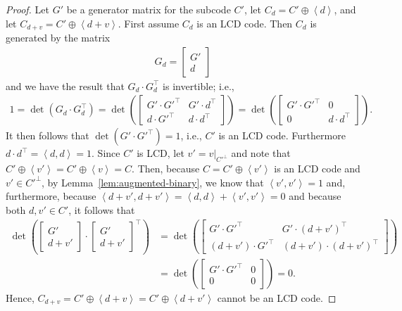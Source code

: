 \documentclass[11pt]{article}
\theoremstyle{definition}
\newcommand{\Ang}[1]{\left\langle#1\right\rangle}
\begin{document}
\begin{proof}
	Let $G'$ be a generator matrix for the subcode $C'$, let $C_d = C' \oplus \Ang{d}$, and let $C_{d + v} = C' \oplus \Ang{d + v}$.
	First  assume $C_d$ is an LCD code.
	Then $C_d$ is generated by the matrix
	\begin{align*}
		G_d = \begin{bmatrix}
			G' \\
			d
		\end{bmatrix}
	\end{align*}
	and we have the result that $G_d \cdot G_d^\top$ is invertible; i.e.,
	\begin{align*}
		1
		= \det(G_d \cdot G_d^\top)
		= \det \left( \begin{bmatrix}
			G' \cdot G'^\top & G' \cdot d^\top \\
			d \cdot G'^\top & d \cdot d^\top
		\end{bmatrix} \right)
		= \det \left( \begin{bmatrix}
			G' \cdot G'^\top & 0 \\
			0 & d \cdot d^\top
		\end{bmatrix} \right).
	\end{align*}
	It then follows that $\det(G' \cdot G'^\top) = 1$, i.e., $C'$ is an LCD code.
	Furthermore $d \cdot d^\top = \Ang{d, d} = 1$.
	Since $C'$ is LCD, let $v' = v |_{C'^\perp}$ and note that $C' \oplus \Ang{v'} = C' \oplus \Ang{v} = C$.
	Then, because $C = C' \oplus \Ang{v'}$ is an LCD code and $v' \in C'^\perp$, by Lemma~\ref{lem:augmented-binary}, we know that $\Ang{v', v'} = 1$ and, furthermore, because $\Ang{d + v', d + v'} = \Ang{d, d} + \Ang{v', v'} = 0$ and because both $d, v' \in C'$, it follows that
	\begin{align*}
		\det \left( \begin{bmatrix}
			G' \\
			d + v'
		\end{bmatrix} \cdot {\begin{bmatrix}
			G' \\
			d + v'
		\end{bmatrix}}^\top \right)
		&= \det \left( \begin{bmatrix}
			G' \cdot G'^\top & G' \cdot {(d + v')}^\top \\
			(d + v') \cdot G'^\top & (d + v') \cdot {(d + v')}^\top
		\end{bmatrix} \right) \\
		&= \det \left( \begin{bmatrix}
			G' \cdot G'^\top & 0 \\
			0 & 0
		\end{bmatrix} \right)
		= 0.
	\end{align*}
	Hence, $C_{d + v} = C' \oplus \Ang{d + v} = C' \oplus \Ang{d + v'}$ cannot be an LCD code.


\end{proof}
\end{document}
